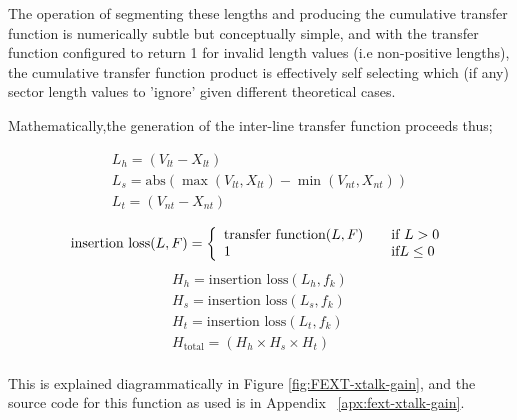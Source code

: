 The operation of segmenting these lengths and producing the cumulative transfer function is numerically subtle but conceptually simple, and with the transfer function configured to return 1 for invalid length values (i.e non-positive lengths), the cumulative transfer function product is effectively self selecting which (if any) sector length values to 'ignore' given different theoretical cases. 

Mathematically,the generation of the inter-line transfer function proceeds thus; 

\begin{equation}
  \begin{array}{l}
  L_h=(V_{lt}-X_{lt})\\
  L_s=\text{abs}(\max(V_{lt},X_{lt})-\min(V_{nt},X_{nt}))\\
  L_t=(V_{nt}-X_{nt})\\
  \end{array}
\end{equation}\label{eq:sectorisation}
\begin{equation}
  \text{insertion loss}(L,F)=\left\{
    \begin{array}{l l}
      \text{transfer function}(L,F) & \quad \text{if}\ L>0\\
      1 & \quad \text{if} L\le 0\\
    \end{array} \right.
\end{equation}\label{eq:insertionloss}
\begin{equation}
  \begin{array}{l}
  H_h=\text{insertion loss}(L_h,f_k)\\
  H_s=\text{insertion loss}(L_s,f_k)\\
  H_t=\text{insertion loss}(L_t,f_k)\\
  H_{\text{total}}=(H_h \times H_s \times H_t)\\
  \end{array}\label{eq:transferproduct}
\end{equation}


This is explained diagrammatically in Figure \ref{fig:FEXT-xtalk-gain}, and the source code for this function as used is in Appendix ~\ref{apx:fext-xtalk-gain}.

